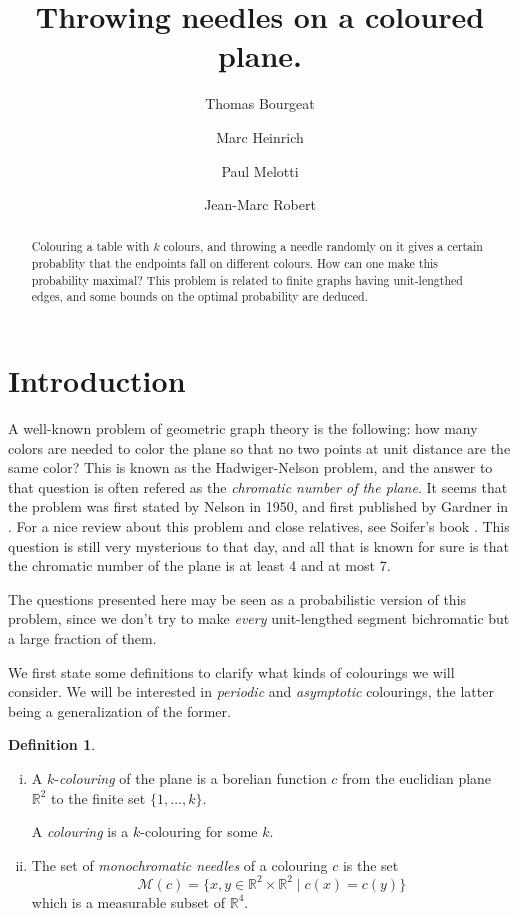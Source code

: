 \documentclass[a4paper,11pt]{article}
\title{Throwing needles on a coloured plane.}
\author{Thomas Bourgeat \and Marc Heinrich \and Paul Melotti 
\and Jean-Marc Robert}
\theoremstyle{definition}
\newtheorem{definition}{Definition}
\theoremstyle{remark}
\newcommand{\R}{\mathbb{R}}
\newcommand{\M}{\mathcal{M}}
\begin{document}
\maketitle

\begin{abstract} Colouring a table with $k$ colours, and throwing a needle
randomly on it gives a certain probablity that the endpoints fall on 
different colours. How can one make this probability maximal?
This problem is related to finite graphs having unit-lengthed edges, and 
some bounds on the optimal probability are deduced.\end{abstract}

\section{Introduction}

A well-known problem of geometric graph theory is the following: how many colors
are needed to color the plane so that no two points at unit distance are the 
same color? This is known as the Hadwiger-Nelson problem, and the answer to that
question is often refered as the \textit{chromatic number of the plane}. It 
seems that the problem was first stated by Nelson in 1950, and first published by 
Gardner in \cite{gardner}.
For a nice review about this problem and close relatives, see Soifer's book
\cite{soifer}. This question is still very mysterious to that day, and all that 
is known for sure is that the chromatic number of the plane is at least 4 and at
most 7.

The questions presented here may be seen as a probabilistic version of this 
problem, since we don't try to make \textit{every} unit-lengthed segment 
bichromatic but a large fraction of them.

We first state some definitions to clarify what kinds of colourings we will consider.
We will be interested in \textit{periodic} and \textit{asymptotic} colourings,
the latter being a generalization of the former.
\begin{definition}
\
\begin{enumerate}[i)] 
\item A $k$-\textit{colouring} of the plane is a borelian function $c$ from the euclidian 
plane~$\R ^2$ to the finite set $\{1, \dots , k \}$.

A \textit{colouring} is a $k$-colouring for some $k$.
\item The set of \textit{monochromatic needles} of a colouring $c$ is the set
\[ \M (c) = \{x,y \in \R ^2 \times \R ^2 \mid c(x) = c(y) \} \]
which is a measurable subset of $\R ^4$.
\end{enumerate}
\end{definition}
\end{document}
